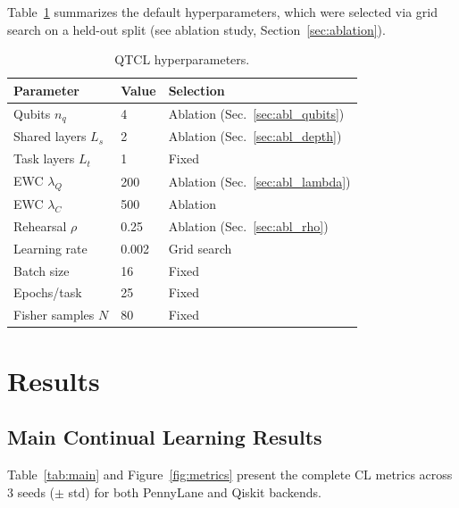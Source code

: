 \documentclass[a4paper,nopdfoutputerror]{quantumarticle}
\begin{document}
Table~\ref{tab:hp} summarizes the default hyperparameters, which were selected
via grid search on a held-out split (see ablation study, Section~\ref{sec:ablation}).

\begin{table}[t]
  \centering
  \caption{QTCL hyperparameters.}
  \label{tab:hp}
  \small
  \begin{tabular}{lll}
    \toprule
    Parameter & Value & Selection \\
    \midrule
    Qubits $n_q$ & 4 & Ablation (Sec.~\ref{sec:abl_qubits}) \\
    Shared layers $L_s$ & 2 & Ablation (Sec.~\ref{sec:abl_depth}) \\
    Task layers $L_t$ & 1 & Fixed \\
    EWC $\lambda_Q$ & 200 & Ablation (Sec.~\ref{sec:abl_lambda}) \\
    EWC $\lambda_C$ & 500 & Ablation \\
    Rehearsal $\rho$ & 0.25 & Ablation (Sec.~\ref{sec:abl_rho}) \\
    Learning rate & 0.002 & Grid search \\
    Batch size & 16 & Fixed \\
    Epochs/task & 25 & Fixed \\
    Fisher samples $N$ & 80 & Fixed \\
    \bottomrule
  \end{tabular}
\end{table}


\section{Results}
\label{sec:results}

\subsection{Main Continual Learning Results}

Table~\ref{tab:main} and Figure~\ref{fig:metrics} present the complete CL
metrics across 3 seeds ($\pm$ std) for both PennyLane and Qiskit backends.
\end{document}
